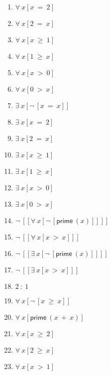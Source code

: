 \documentclass{article}
\begin{document}
\begin{enumerate}
\item $\forall \ x[x \ = \ 2]$

\item $\forall \ x[2 \ = \ x]$

\item $\forall \ x[x \ \ge \ 1]$

\item $\forall \ x[1 \ \ge \ x]$

\item $\forall \ x[x \ > \ 0]$

\item $\forall \ x[0 \ > \ x]$

\item $\exists \ x[\neg \ [x \ = \ x]]$

\item $\exists \ x[x \ = \ 2]$

\item $\exists \ x[2 \ = \ x]$

\item $\exists \ x[x \ \ge \ 1]$

\item $\exists \ x[1 \ \ge \ x]$

\item $\exists \ x[x \ > \ 0]$

\item $\exists \ x[0 \ > \ x]$

\item $\neg \ [[\forall \ x[\neg \ [\mathsf{prime} \ (x)]]]]$

\item $\neg \ [[\forall \ x[x \ > \ x]]]$

\item $\neg \ [[\exists \ x[\neg \ [\mathsf{prime} \ (x)]]]]$

\item $\neg \ [[\exists \ x[x \ > \ x]]]$

\item $2 \ : \ 1$

\item $\forall \ x[\neg \ [x \ \ge \ x]]$

\item $\forall \ x[\mathsf{prime} \ (x \ + \ x)]$

\item $\forall \ x[x \ \ge \ 2]$

\item $\forall \ x[2 \ \ge \ x]$

\item $\forall \ x[x \ > \ 1]$


\end{enumerate}
\end{document}
